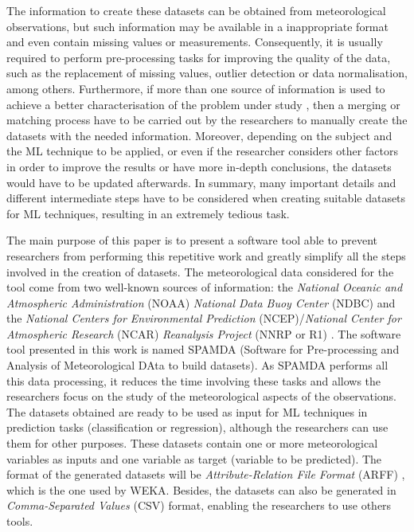 \documentclass[review]{elsarticle}
\begin{document}
		The information to create these datasets can be obtained from meteorological observations, but such information may be available in a inappropriate format and even contain missing values or measurements. Consequently, it is usually required to perform pre-processing tasks for improving the quality of the data, such as the replacement of missing values, outlier detection or data normalisation, among others. Furthermore, if more than one source of information is used to achieve a better characterisation of the problem under study \cite{JOHANSSON2015143, FERNANDEZ201544, Adams2010}, then a merging or matching process have to be carried out by the researchers to manually create the datasets with the needed information. Moreover, depending on the subject and the ML technique to be applied, or even if the researcher considers other factors in order to improve the results or have more in-depth conclusions, the datasets would have to be updated afterwards. In summary, many important details and different intermediate steps have to be considered when creating suitable datasets for ML techniques, resulting in an extremely tedious task.

		The main purpose of this paper is to present a software tool able to prevent researchers from performing this repetitive work and greatly simplify all the steps involved in the creation of datasets. The meteorological data considered for the tool come from two well-known sources of information: the \textit{National Oceanic and Atmospheric Administration} (NOAA) \textit{National Data Buoy Center} (NDBC) \cite{NOAA} and the \textit{National Centers for Environmental Prediction} (NCEP)/\textit{National Center for Atmospheric Research} (NCAR) \textit{Reanalysis Project} (NNRP or R1) \cite{Kalnay1996, Kistler2001}. The software tool presented in this work is named SPAMDA (Software for Pre-processing and Analysis of Meteorological DAta to build datasets). As SPAMDA performs all this data processing, it reduces the time involving these tasks and allows the researchers focus on the study of the meteorological aspects of the observations. The datasets obtained are ready to be used as input for ML techniques in prediction tasks (classification or regression), although the researchers can use them for other purposes. These datasets contain one or more meteorological variables as inputs and one variable as target (variable to be predicted). The format of the generated datasets will be \textit{Attribute-Relation File Format} (ARFF) \cite{WEKA_ARFF}, which is the one used by WEKA. Besides, the datasets can also be generated in \textit{Comma-Separated Values} (CSV) format, enabling the researchers to use others tools.
		
\end{document}
